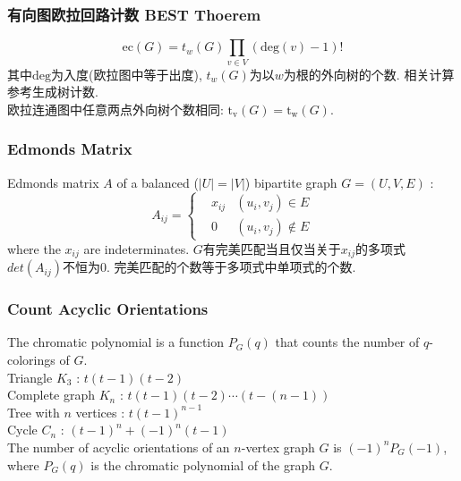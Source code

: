 \subsubsection{有向图欧拉回路计数 BEST Thoerem}
        \[ \mathrm{ec}(G) = t_w(G)\prod_{v \in{V}}(\mathrm{deg}(v) - 1)! \]
        其中$\mathrm{deg}$为入度(欧拉图中等于出度), $t_w(G)$为以$w$为根的外向树的个数. 相关计算参考生成树计数.\\
        欧拉连通图中任意两点外向树个数相同: $\mathrm{t_v}(G) = \mathrm{t_w}(G)$.
    \subsubsection{Edmonds Matrix}
        Edmonds matrix $A$ of a balanced ($|U|=|V|$) bipartite graph $G=(U,V,E)$ : 
        \[A_{ij}=\left\{
            \begin{aligned}
                & x_{ij} & (u_i,v_j)\in E\\
                & 0 & (u_i,v_j)\notin E
            \end{aligned}
            \right.\]
        where the $x_{ij}$ are indeterminates. $G$有完美匹配当且仅当关于$x_{ij}$的多项式$det(A_{ij})$不恒为$0$.
        完美匹配的个数等于多项式中单项式的个数.
\subsubsection{Count Acyclic Orientations}
    \noindent
    The chromatic polynomial is a function $P_G(q)$ that counts the number of $q$-colorings of $G$.\\
    Triangle $K_3$ : $t(t-1)(t-2)$\\
    Complete graph $K_n$ : $t(t-1)(t-2)\cdots (t-(n-1))$\\
    Tree with $n$ vertices : $t(t-1)^{n-1}$\\
    Cycle $C_n$ : $(t-1)^{n}+(-1)^{n}(t-1)$\\
    The number of acyclic orientations of an $n$-vertex graph $G$ is $(−1)^nP_G(−1)$, where $P_G(q)$ is the chromatic polynomial of the graph
    $G$.
